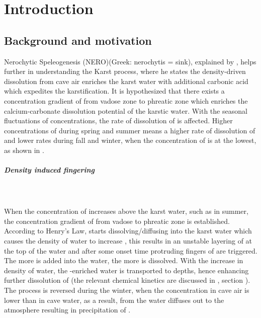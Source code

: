 \chapter{Introduction}\label{chapter:introduction}
\thispagestyle{empty}
\section{Background and motivation}
Nerochytic Speleogenesis (NERO)(Greek: nerochytis = sink), explained by \citet{Scherzer2017}, 
helps further in understanding the Karst process, where he states the density-driven  dissolution 
from cave air enriches the karst water with additional carbonic acid which expedites the karstification. 
It is hypothesized that there exists a concentration gradient of  from vadose zone to phreatic zone 
which enriches the calcium-carbonate dissolution potential of the karstic water. 
With the seasonal fluctuations of  concentrations, the rate of dissolution of  is affected. 
Higher concentrations of  during spring and summer means a higher rate of dissolution of  and lower rates 
during fall and winter, when the concentration of  is at the lowest, as shown in .

\paragraph*{Density induced fingering}\mbox{}\\ \\
When the concentration of  increases above the karst water, such as in summer, the concentration gradient of  
from vadose to phreatic zone is established. According to Henry's Law,  starts dissolving/diffusing into the karst water 
which causes the density of water to increase \cite{garcia2001density}, this results in an unstable layering of  at 
the top of the water and after some onset time protruding fingers of  are triggered. The more  is added into the water, 
the more  is dissolved. With the increase in density of water, the -enriched water 
is transported to depths, hence enhancing further dissolution of  (the relevant chemical kinetics are 
discussed in , section ). The process is reversed during the winter, 
when the  concentration in cave air is lower than in cave water, as a result,  from the water diffuses 
out to the atmosphere resulting in precipitation of .\\ 


